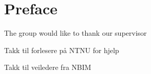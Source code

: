 \chapter*{Preface}

The group would like to thank our supervisor 

Takk til forlesere på NTNU for hjelp

Takk til veiledere fra NBIM

\newpage